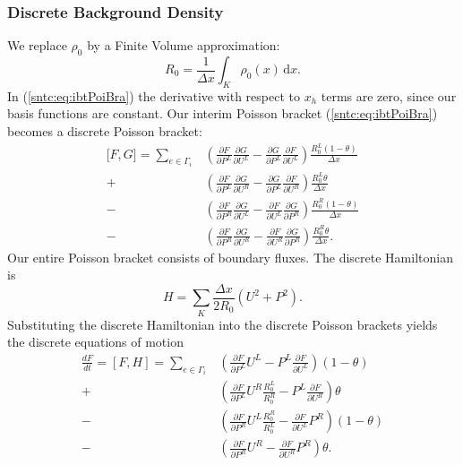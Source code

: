 \documentclass{article}
\begin{document}
\subsubsection{Discrete Background Density}
We replace $\rho_0$ by a Finite Volume approximation:
\begin{equation}
	R_0 = \frac{1}{\Delta x} \int_K \! \rho_0(x) \, \mathrm{d}x.
\end{equation}
In (\ref{sntc:eq:ibtPoiBra}) the derivative with respect to $x_h$ terms are zero, since our basis functions are constant. Our interim Poisson bracket (\ref{sntc:eq:ibtPoiBra}) becomes a discrete Poisson bracket:
\begin{equation}
	\begin{aligned}
		{[}F, G{]} = \sum_{e\in\Gamma_i} & \left( \frac{\partial F}{\partial P^L} \frac{\partial G}{\partial U^L}- \frac{\partial G}{\partial P^L} \frac{\partial F}{\partial U^L} \right) \frac{R_0^L (1-\theta)}{\Delta x} \\
	+ & \left( \frac{\partial F}{\partial P^L} \frac{\partial G}{\partial U^R}- \frac{\partial G}{\partial P^L} \frac{\partial F}{\partial U^R} \right) \frac{R_0^L \theta}{\Delta x} \\
	- &\left( \frac{\partial F}{\partial P^R} \frac{\partial G}{\partial U^L} - \frac{\partial F}{\partial U^L} \frac{\partial G}{\partial P^R}\right) \frac{R_0^R (1-\theta)}{\Delta x} \\
	- &\left( \frac{\partial F}{\partial P^R} \frac{\partial G}{\partial U^R} - \frac{\partial F}{\partial U^R} \frac{\partial G}{\partial P^R}\right) \frac{R_0^R \theta}{\Delta x}.	
	\end{aligned}
\end{equation}
Our entire Poisson bracket consists of boundary fluxes. The discrete Hamiltonian 
 is
\begin{equation}
	H = \sum_K \frac{\Delta x }{2 R_0} \left(U^2 + P^2\right).
\end{equation}
Substituting the discrete Hamiltonian into the discrete Poisson brackets yields the discrete equations of motion
\begin{equation}
	\begin{aligned}
		\frac{d F}{d t} = [F, H] = \sum_{e\in\Gamma_i} 
	  & \left( \frac{\partial F}{\partial P^L} U^L- P^L \frac{\partial F}{\partial U^L} \right) (1-\theta) \\
	+ & \left( \frac{\partial F}{\partial P^L} U^R \frac{R_0^L}{R_0^R}- P^L \frac{\partial F}{\partial U^R} \right) \theta \\
	- &\left( \frac{\partial F}{\partial P^R} U^L \frac{R_0^R}{R_0^L} - \frac{\partial F}{\partial U^L} P^R\right) (1-\theta) \\
	- &\left( \frac{\partial F}{\partial P^R} U^R - \frac{\partial F}{\partial U^R} P^R\right) \theta.	
	\end{aligned}
\end{equation}
\end{document}
